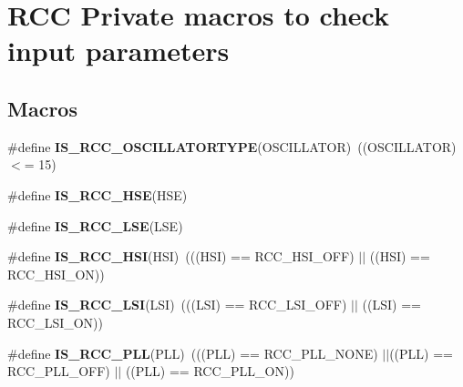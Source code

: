 \hypertarget{group___r_c_c___i_s___r_c_c___definitions}{}\section{R\+CC Private macros to check input parameters}
\label{group___r_c_c___i_s___r_c_c___definitions}
\subsection*{Macros}
\begin{DoxyCompactItemize}
\item 
\#define {\bfseries I\+S\+\_\+\+R\+C\+C\+\_\+\+O\+S\+C\+I\+L\+L\+A\+T\+O\+R\+T\+Y\+PE}(O\+S\+C\+I\+L\+L\+A\+T\+OR)~((O\+S\+C\+I\+L\+L\+A\+T\+OR) $<$= 15)\hypertarget{group___r_c_c___i_s___r_c_c___definitions_ga3da0bb3923503cb8e84e5bd75912fbb8}{}\label{group___r_c_c___i_s___r_c_c___definitions_ga3da0bb3923503cb8e84e5bd75912fbb8}

\item 
\#define {\bfseries I\+S\+\_\+\+R\+C\+C\+\_\+\+H\+SE}(H\+SE)
\item 
\#define {\bfseries I\+S\+\_\+\+R\+C\+C\+\_\+\+L\+SE}(L\+SE)
\item 
\#define {\bfseries I\+S\+\_\+\+R\+C\+C\+\_\+\+H\+SI}(H\+SI)~(((H\+SI) == R\+C\+C\+\_\+\+H\+S\+I\+\_\+\+O\+FF) $\vert$$\vert$ ((H\+SI) == R\+C\+C\+\_\+\+H\+S\+I\+\_\+\+ON))\hypertarget{group___r_c_c___i_s___r_c_c___definitions_ga9d2bad5b4ad9ba8fb224ddbd949c27d6}{}\label{group___r_c_c___i_s___r_c_c___definitions_ga9d2bad5b4ad9ba8fb224ddbd949c27d6}

\item 
\#define {\bfseries I\+S\+\_\+\+R\+C\+C\+\_\+\+L\+SI}(L\+SI)~(((L\+SI) == R\+C\+C\+\_\+\+L\+S\+I\+\_\+\+O\+FF) $\vert$$\vert$ ((L\+SI) == R\+C\+C\+\_\+\+L\+S\+I\+\_\+\+ON))\hypertarget{group___r_c_c___i_s___r_c_c___definitions_gaaa7381dd9821c69346ce64453863b786}{}\label{group___r_c_c___i_s___r_c_c___definitions_gaaa7381dd9821c69346ce64453863b786}

\item 
\#define {\bfseries I\+S\+\_\+\+R\+C\+C\+\_\+\+P\+LL}(P\+LL)~(((P\+LL) == R\+C\+C\+\_\+\+P\+L\+L\+\_\+\+N\+O\+NE) $\vert$$\vert$((P\+LL) == R\+C\+C\+\_\+\+P\+L\+L\+\_\+\+O\+FF) $\vert$$\vert$ ((P\+LL) == R\+C\+C\+\_\+\+P\+L\+L\+\_\+\+ON))\hypertarget{group___r_c_c___i_s___r_c_c___definitions_ga373b85039eb8036373fe80948c153ee0}{}\label{group___r_c_c___i_s___r_c_c___definitions_ga373b85039eb8036373fe80948c153ee0}


\end{DoxyCompactItemize}
